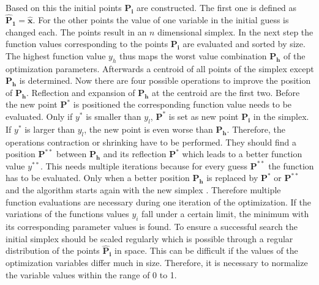 Based on this the initial points $\mathbf{\hat{P}_i}$ are constructed. The first one is defined as $\mathbf{\hat{P}_1} = \mathbf{\hat{x}}$. For the other points the value of one variable in the initial guess is changed each. The points result in an $n$ dimensional simplex. In the next step the function values corresponding to the points $\mathbf{P_i}$ are evaluated and sorted by size. The highest function value $y_h$ thus maps the worst value combination $\mathbf{P_h}$ of the optimization parameters. Afterwards a centroid of all points of the simplex except $\mathbf{P_h}$ is determined. Now there are four possible operations to improve the position of $\mathbf{P_h}$. Reflection and expansion of $\mathbf{P_h}$ at the centroid are the first two. Before the new point $\mathbf{P^{*}}$ is positioned the corresponding function value needs to be evaluated. Only if $y^{*}$ is smaller than $y_l$, $\mathbf{P^{*}}$ is set as new point $\mathbf{P_i}$ in the simplex. If $y^{*}$ is larger than $y_l$, the new point is even worse than $\mathbf{P_h}$. Therefore, the operations contraction or shrinking have to be performed. They should find a position $\mathbf{P^{**}}$ between $\mathbf{P_h}$ and its reflection $\mathbf{P^{*}}$ which leads to a better function value $y^{**}$. This needs multiple iterations because for every guess $\mathbf{P^{**}}$ the function has to be evaluated. Only when a better position $\mathbf{P_h}$ is replaced by $\mathbf{P^{*}}$ or $\mathbf{P^{**}}$ and the algorithm starts again with the new simplex \cite{nelder_simplex_1965}. Therefore multiple function evaluations are necessary during one iteration of the optimization. If the variations of the functions values $y_i$ fall under a certain limit, the minimum with its corresponding parameter values is found. To ensure a successful search the initial simplex should be scaled regularly \cite{baudin_nelder-mead_nodate} which is possible through a regular distribution of the points $\mathbf{\hat{P}_i}$ in space. This can be difficult if the values of the optimization variables differ much in size. Therefore, it is necessary to normalize the variable values within the range of 0 to 1. 



